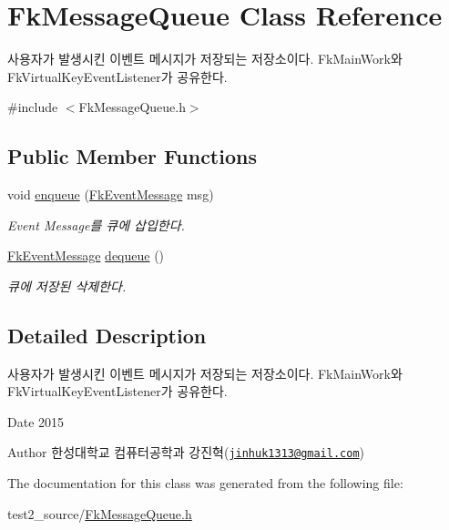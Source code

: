 \hypertarget{class_fk_message_queue}{}\section{Fk\+Message\+Queue Class Reference}
\label{class_fk_message_queue}


사용자가 발생시킨 이벤트 메시지가 저장되는 저장소이다. Fk\+Main\+Work와 Fk\+Virtual\+Key\+Event\+Listener가 공유한다.  




{\ttfamily \#include $<$Fk\+Message\+Queue.\+h$>$}

\subsection*{Public Member Functions}
\begin{DoxyCompactItemize}
\item 
\hypertarget{class_fk_message_queue_add66752fcec0d72ff8746d8be03288a9}{}void \hyperlink{class_fk_message_queue_add66752fcec0d72ff8746d8be03288a9}{enqueue} (\hyperlink{class_fk_event_message}{Fk\+Event\+Message} msg)\label{class_fk_message_queue_add66752fcec0d72ff8746d8be03288a9}

\begin{DoxyCompactList}\small\item\em Event Message를 큐에 삽입한다. \end{DoxyCompactList}\item 
\hypertarget{class_fk_message_queue_a81c47fca85ba7a943b24b60f667998fe}{}\hyperlink{class_fk_event_message}{Fk\+Event\+Message} \hyperlink{class_fk_message_queue_a81c47fca85ba7a943b24b60f667998fe}{dequeue} ()\label{class_fk_message_queue_a81c47fca85ba7a943b24b60f667998fe}

\begin{DoxyCompactList}\small\item\em 큐에 저장된 삭제한다. \end{DoxyCompactList}\end{DoxyCompactItemize}


\subsection{Detailed Description}
사용자가 발생시킨 이벤트 메시지가 저장되는 저장소이다. Fk\+Main\+Work와 Fk\+Virtual\+Key\+Event\+Listener가 공유한다. 

\begin{DoxyDate}{Date}
2015 
\end{DoxyDate}
\begin{DoxyAuthor}{Author}
한성대학교 컴퓨터공학과 강진혁(\href{mailto:jinhuk1313@gmail.com}{\tt jinhuk1313@gmail.\+com}) 
\end{DoxyAuthor}


The documentation for this class was generated from the following file\+:\begin{DoxyCompactItemize}
\item 
test2\+\_\+source/\hyperlink{_fk_message_queue_8h}{Fk\+Message\+Queue.\+h}\end{DoxyCompactItemize}
